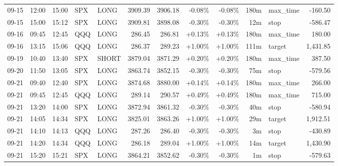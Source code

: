\documentclass[11pt,a4paper,twoside]{article}
\begin{document}
\begin{center}
\begin{longtable}{>{\color{txtmain}}l l l l l r r r r r >{\color{txtmain}}l r}
09-15 & 12:00 & 15:00 & SPX & LONG & 3909.39 & 3906.18 & \textcolor{lossred}{-0.08\%} & \textcolor{lossred}{-0.08\%} & 180m & max\_time & \textcolor{lossred}{-160.50} \\
09-15 & 15:00 & 15:12 & SPX & LONG & 3909.81 & 3898.08 & \textcolor{lossred}{-0.30\%} & \textcolor{lossred}{-0.30\%} & 12m & stop & \textcolor{lossred}{-586.47} \\
09-16 & 09:45 & 12:45 & QQQ & LONG & 286.45 & 286.81 & \textcolor{wingreen}{+0.13\%} & \textcolor{wingreen}{+0.13\%} & 180m & max\_time & \textcolor{wingreen}{180.00} \\
09-16 & 13:15 & 15:06 & QQQ & LONG & 286.37 & 289.23 & \textcolor{wingreen}{+1.00\%} & \textcolor{wingreen}{+1.00\%} & 111m & target & \textcolor{wingreen}{1,431.85} \\
09-19 & 10:40 & 13:40 & SPX & SHORT & 3879.04 & 3871.29 & \textcolor{wingreen}{+0.20\%} & \textcolor{wingreen}{+0.20\%} & 180m & max\_time & \textcolor{wingreen}{387.50} \\
09-20 & 11:50 & 13:05 & SPX & LONG & 3863.74 & 3852.15 & \textcolor{lossred}{-0.30\%} & \textcolor{lossred}{-0.30\%} & 75m & stop & \textcolor{lossred}{-579.56} \\
09-21 & 09:40 & 12:40 & SPX & LONG & 3874.68 & 3880.00 & \textcolor{wingreen}{+0.14\%} & \textcolor{wingreen}{+0.14\%} & 180m & max\_time & \textcolor{wingreen}{266.00} \\
09-21 & 09:45 & 12:45 & QQQ & LONG & 289.14 & 290.57 & \textcolor{wingreen}{+0.49\%} & \textcolor{wingreen}{+0.49\%} & 180m & max\_time & \textcolor{wingreen}{715.00} \\
09-21 & 13:20 & 14:00 & SPX & LONG & 3872.94 & 3861.32 & \textcolor{lossred}{-0.30\%} & \textcolor{lossred}{-0.30\%} & 40m & stop & \textcolor{lossred}{-580.94} \\
09-21 & 14:05 & 14:34 & SPX & LONG & 3825.01 & 3863.26 & \textcolor{wingreen}{+1.00\%} & \textcolor{wingreen}{+1.00\%} & 29m & target & \textcolor{wingreen}{1,912.51} \\
09-21 & 14:10 & 14:13 & QQQ & LONG & 287.26 & 286.40 & \textcolor{lossred}{-0.30\%} & \textcolor{lossred}{-0.30\%} & 3m & stop & \textcolor{lossred}{-430.89} \\
09-21 & 14:20 & 14:34 & QQQ & LONG & 286.18 & 289.04 & \textcolor{wingreen}{+1.00\%} & \textcolor{wingreen}{+1.00\%} & 14m & target & \textcolor{wingreen}{1,430.90} \\
09-21 & 15:20 & 15:21 & SPX & LONG & 3864.21 & 3852.62 & \textcolor{lossred}{-0.30\%} & \textcolor{lossred}{-0.30\%} & 1m & stop & \textcolor{lossred}{-579.63} \\

\end{longtable}
\end{center}
\end{document}
